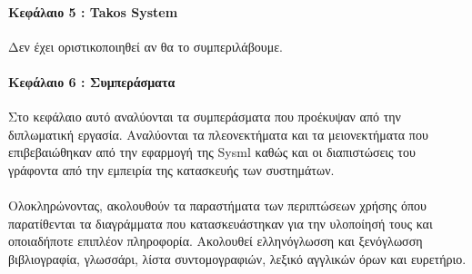 \documentclass[a4paper, 12pt, twoside]{report}
\begin{document}
		\paragraph{Κεφάλαιο 5 : Takos System} {Δεν έχει οριστικοποιηθεί αν θα το συμπεριλάβουμε.
		}
		\paragraph{Κεφάλαιο 6 : Συμπεράσματα} {Στο κεφάλαιο αυτό αναλύονται τα συμπεράσματα που προέκυψαν από την διπλωματική εργασία. Αναλύονται τα πλεονεκτήματα και τα μειονεκτήματα που επιβεβαιώθηκαν από την εφαρμογή της Sysml καθώς και οι διαπιστώσεις του γράφοντα από την εμπειρία της κατασκευής των συστημάτων.
		}
		\paragraph{} {Ολοκληρώνοντας, ακολουθούν τα παραστήματα των περιπτώσεων χρήσης όπου παρατίθενται τα διαγράμματα που κατασκευάστηκαν για την υλοποίησή τους και οποιαδήποτε επιπλέον πληροφορία. Ακολουθεί ελληνόγλωσση και ξενόγλωσση βιβλιογραφία, γλωσσάρι, λίστα συντομογραφιών, λεξικό αγγλικών όρων και ευρετήριο.
		}
\end{document}
